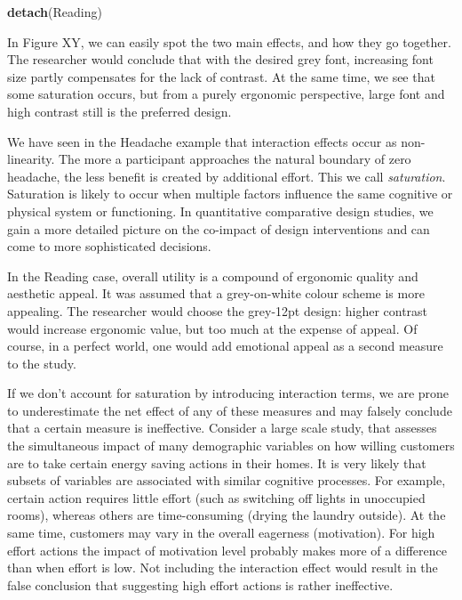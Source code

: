 \documentclass[]{svmono}
\newenvironment{Shaded}{\begin{snugshade}}{\end{snugshade}}
\newcommand{\KeywordTok}[1]{\textcolor[rgb]{0.13,0.29,0.53}{\textbf{#1}}}
\newcommand{\NormalTok}[1]{#1}
\begin{document}
\begin{Shaded}
\begin{Highlighting}[]
\KeywordTok{detach}\NormalTok{(Reading)}
\end{Highlighting}
\end{Shaded}

In Figure XY, we can easily spot the two main effects, and how they go
together. The researcher would conclude that with the desired grey font,
increasing font size partly compensates for the lack of contrast. At the
same time, we see that some saturation occurs, but from a purely
ergonomic perspective, large font and high contrast still is the
preferred design.

We have seen in the Headache example that interaction effects occur as
non-linearity. The more a participant approaches the natural boundary of
zero headache, the less benefit is created by additional effort. This we
call \emph{saturation}. Saturation is likely to occur when multiple
factors influence the same cognitive or physical system or functioning.
In quantitative comparative design studies, we gain a more detailed
picture on the co-impact of design interventions and can come to more
sophisticated decisions.

In the Reading case, overall utility is a compound of ergonomic quality
and aesthetic appeal. It was assumed that a grey-on-white colour scheme
is more appealing. The researcher would choose the grey-12pt design:
higher contrast would increase ergonomic value, but too much at the
expense of appeal. Of course, in a perfect world, one would add
emotional appeal as a second measure to the study.

If we don't account for saturation by introducing interaction terms, we
are prone to underestimate the net effect of any of these measures and
may falsely conclude that a certain measure is ineffective. Consider a
large scale study, that assesses the simultaneous impact of many
demographic variables on how willing customers are to take certain
energy saving actions in their homes. It is very likely that subsets of
variables are associated with similar cognitive processes. For example,
certain action requires little effort (such as switching off lights in
unoccupied rooms), whereas others are time-consuming (drying the laundry
outside). At the same time, customers may vary in the overall eagerness
(motivation). For high effort actions the impact of motivation level
probably makes more of a difference than when effort is low. Not
including the interaction effect would result in the false conclusion
that suggesting high effort actions is rather ineffective.
\end{document}
